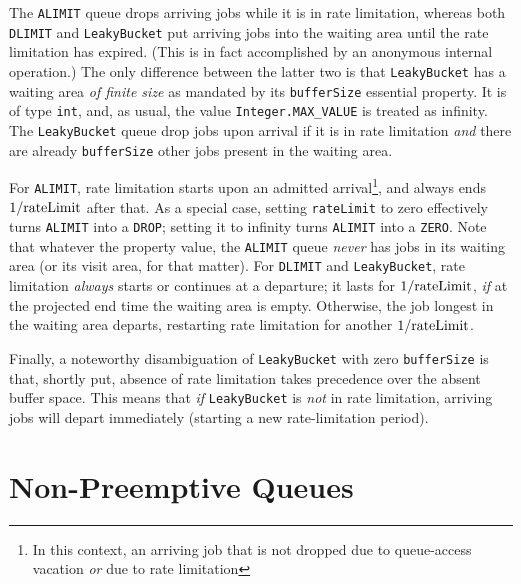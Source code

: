 The \lstinline|ALIMIT| queue
  drops arriving jobs while it is
  in rate limitation,
  whereas both
  \lstinline|DLIMIT|
  and \lstinline|LeakyBucket|
  put arriving jobs into the waiting area
  until the rate limitation has expired.
(This is in fact accomplished by an
  anonymous internal operation.)
The only difference between the latter two
  is that \lstinline|LeakyBucket|
  has a waiting area {\em of finite size\/}
  as mandated by its \lstinline|bufferSize|
  essential property.
It is of type \lstinline|int|,
  and, as usual,
  the value \lstinline|Integer.MAX_VALUE|
  is treated as infinity.
The \lstinline|LeakyBucket| queue
  drop jobs upon arrival
  if it is in rate limitation
  {\em and\/} there are
  already \lstinline|bufferSize|
  other jobs present in the waiting area.
  
For \lstinline|ALIMIT|,
  rate limitation starts upon an admitted arrival\footnote{
  In this context, an arriving job that is not dropped
  due to queue-access vacation {\em or\/}
  due to rate limitation},
  and always ends $1/\mbox{\lstinline|rateLimit|}$
  after that.
As a special case,
  setting \lstinline|rateLimit| to zero
  effectively turns \lstinline|ALIMIT|
  into a \lstinline|DROP|;
  setting it to infinity
  turns \lstinline|ALIMIT| into a \lstinline|ZERO|.
Note that whatever the property value,
  the \lstinline|ALIMIT|
  queue {\em never\/} has jobs in its
  waiting area (or its visit area, for that matter).
For \lstinline|DLIMIT| and \lstinline|LeakyBucket|,
  rate limitation {\em always\/} starts
  or continues at a departure;
  it lasts for $1/\mbox{\lstinline|rateLimit|}$,
  {\em if\/} at the projected end time
  the waiting area is empty.
Otherwise,
  the job longest in the waiting area
  departs,
  restarting rate limitation
  for another $1/\mbox{\lstinline|rateLimit|}$.
  
Finally,
  a noteworthy disambiguation
  of \lstinline|LeakyBucket|
  with zero \lstinline|bufferSize|
  is that, shortly put,
  absence of rate limitation takes precedence
  over the absent buffer space.
This means that {\em if\/} \lstinline|LeakyBucket|
  is {\em not\/} in rate limitation,
  arriving jobs will depart immediately
  (starting a new rate-limitation period).

\section{Non-Preemptive Queues}
\label{sec:non-preemptive-queues}

